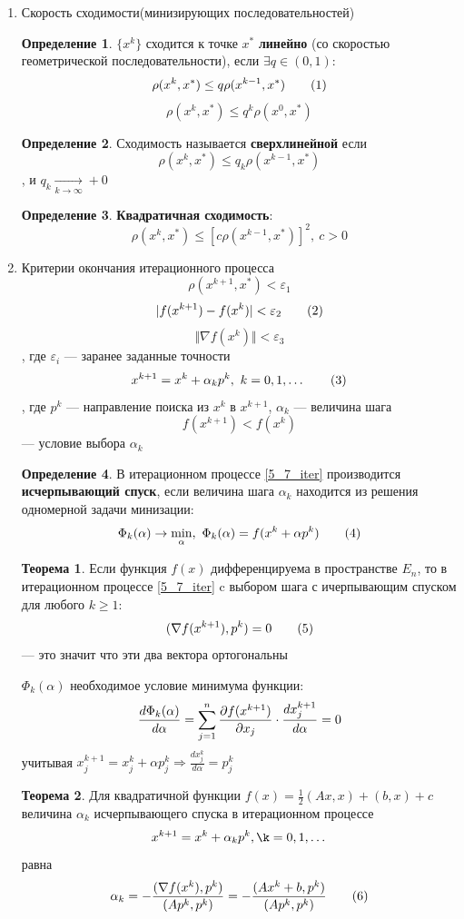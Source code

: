 \documentclass[oneside]{book}
\newcommand\addtag{\refstepcounter{equation}\tag{\theequation}}
\theoremstyle{plain}
\theoremstyle{remark}
\theoremstyle{definition}
\newtheorem{theorem}{Теорема}[section]
\newtheorem*{definition}{Определение}
\begin{document}
\begin{enumerate}
\item Скорость сходимости(минизирующих последовательностей)
\label{sec:org93130af}
\begin{definition}
\(\{x^k\}\) сходится к точке \(x^*\) \textbf{линейно} (со скоростью геометрической последовательности), если \(\exists q \in (0, 1):\)
\[ \rho(x^k, x^*) \le q \rho(x^{k - 1}, x^*) \addtag\label{5_5_linear}\]
\[ \rho(x^k, x^*) \le q^k \rho(x^0, x^*) \]
\end{definition}
\begin{definition}
Сходимость называется \textbf{сверхлинейной} если
\[ \rho(x^k, x^*) \le q_k \rho(x^{k - 1}, x^*) \], и \(q_k \xrightarrow[k \to \infty]{} +0\)
\end{definition}
\begin{definition}
\textbf{Квадратичная сходимость}:
\[ \rho(x^k, x^*) \le \left[ c \rho(x^{k - 1}, x^*)\right]^2,\ c > 0 \]
\end{definition}
\item Критерии окончания итерационного процесса
\label{sec:org679c1e3}
\[ \rho(x^{k + 1}, x^*) < \varepsilon_1 \]
\[ |f(x^{k + 1}) - f(x^k)| < \varepsilon_2 \addtag\label{5_6_eps2}\]
\[ \Vert \nabla f(x^k) \Vert < \varepsilon_3 \]
, где \(\varepsilon_i\) --- заранее заданные точности
\[ x^{k + 1} = x^k + \alpha_k p^k,\ k=0, 1, \dots \addtag\label{5_7_iter}\]
, где \(p^k\) --- направление поиска из \(x^k\) в \(x^{k + 1}\), \(\alpha_k\) --- величина шага
\[ f(x^{k + 1}) < f(x^k) \] --- условие выбора \(\alpha_k\)
\begin{definition}
В итерационном процессе \ref{5_7_iter} производится \textbf{исчерпывающий спуск}, если величина шага \(\alpha_k\) находится из решения одномерной задачи минизации:
\[ \Phi_k(\alpha) \to \min_\alpha,\ \Phi_k(\alpha) = f(x^k + \alpha p^k) \addtag\label{5_8_cond}\]
\end{definition}
\begin{theorem}
Если функция \(f(x)\) дифференцируема в пространстве \(E_n\), то в итерационном процессе \ref{5_7_iter} c выбором шага с ичерпывающим спуском для любого \(k \ge 1\):
\[ (\nabla f(x^{k + 1}), p^k) = 0 \addtag\label{5_9_orto}\]
--- это значит что эти два вектора ортогональны
\end{theorem}
 \(\Phi_k(\alpha)\) необходимое условие минимума функции:
\[ \frac{d\Phi_k(\alpha)}{d \alpha} = \sum^n_{j = 1} \frac{\partial f(x^{k + 1})}{\partial x_j} \cdot \frac{d x_j^{k + 1}}{d \alpha} = 0 \]
учитывая \(x_j^{k + 1} = x_j^k + \alpha p_j^k \Rightarrow \frac{dx^k_j}{d\alpha} = p_j^k\)

\begin{theorem}
Для квадратичной функции \(f(x) = \frac{1}{2}(Ax, x) + (b ,x) + c\) величина \(\alpha_k\) исчерпывающего спуска в итерационном процессе
\[ x^{k + 1} = x^k + \alpha_k p^k, \k = 0, 1, \dots \]
равна
\[ \alpha_k = -\frac{(\nabla f(x^k), p^k)}{(A p^k, p^k)} = - \frac{(Ax^k + b, p^k)}{(Ap^k, p^k)} \addtag\label{5_10_alpha}\]
\end{theorem}
\end{enumerate}
\end{document}
